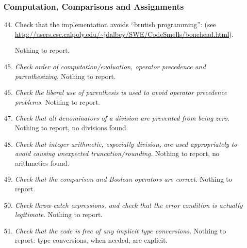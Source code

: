 	\subsubsection{Computation, Comparisons and Assignments}
		\begin{enumerate}
			\setcounter{enumi}{43}
			\item \begin{itshape}
				Check that the implementation avoids “brutish programming”: (see \url{http://users.csc.calpoly.edu/~jdalbey/SWE/CodeSmells/bonehead.html}).
				\end{itshape}\newline
			Nothing to report. %

			\item \textit{Check order of computation/evaluation, operator precedence and parenthesizing.}\newline
			Nothing to report. %

			\item \textit{Check the liberal use of parenthesis is used to avoid operator precedence problems.}\newline
			Nothing to report. %

			\item \textit{Check that all denominators of a division are prevented from being zero.}\newline
			Nothing to report, no divisions found. %

			\item \textit{Check that integer arithmetic, especially division, are used appropriately to avoid causing unexpected truncation/rounding.}\newline
			Nothing to report, no arithmetics found. %

			\item \textit{Check that the comparison and Boolean operators are correct.}\newline
			Nothing to report. %

			\item \textit{Check throw-catch expressions, and check that the error condition is actually legitimate.}
			Nothing to report. %
			
			\item \textit{Check that the code is free of any implicit type conversions.}\newline
			Nothing to report: type conversions, when needed, are explicit. %

		\end{enumerate}

